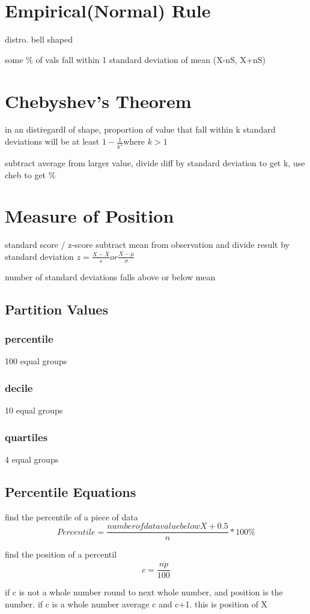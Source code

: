 \documentclass[11pt]{amsart}
\begin{document}
\section{Empirical(Normal) Rule}
\par distro. bell shaped
\par some \% of vals fall within 1 standard deviation of mean (X-nS, X+nS)
\section{Chebyshev's Theorem}
\par in an dist\. regardl of shape, proportion of value that fall within k standard deviations will be at least $1-\frac{1}{k^2}$where $k > 1$
\par subtract average from larger value, divide diff by standard deviation to get k, use cheb to get \%
\section{Measure of Position}
\par standard score / z-score subtract mean from observation and divide result by standard deviation $z = \frac {X - \bar{X}}{s}  or  \frac{X - \mu}{\sigma} $
\par number of standard deviations falls above or below mean
\subsection{Partition Values}
\subsubsection{percentile}
\par 100 equal groups
\subsubsection{decile}
\par 10 equal groups
\subsubsection{quartiles}
\par 4 equal groups
\subsection{Percentile Equations}
\par find the percentile of a piece of data
\begin{equation}
Percentile = \frac{number of data value below X + 0.5}{n} * 100\%
\end{equation}
\par find the position of a percentil
\begin{equation}
  c = \frac{n \dot p}{100}
\end{equation}
\par if c is not a whole number round to next whole number, and position is
the number. if c is a whole number average c and c+1. this is position of
X
\end{document}
